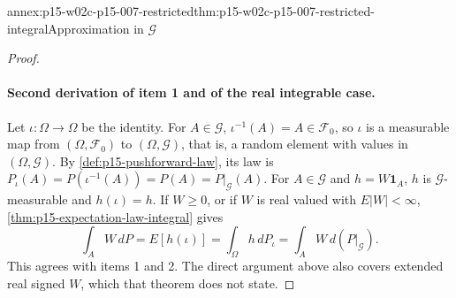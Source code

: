 \begin{annexitem}{annex:p15-w02c-p15-007-restricted}{thm:p15-w02c-p15-007-restricted-integral}{Approximation in \(\mathcal G\)}
\begin{proof}
\paragraph{Second derivation of item 1 and of the real integrable case.}
Let \(\iota:\Omega\to\Omega\) be the identity. For \(A\in\mathcal G\),
\(\iota^{-1}(A)=A\in\mathcal F_0\), so \(\iota\) is a measurable map from
\((\Omega,\mathcal F_0)\) to \((\Omega,\mathcal G)\), that is, a random
element with values in \((\Omega,\mathcal G)\). By
\cref{def:p15-pushforward-law}, its law is
\(P_\iota(A)=P(\iota^{-1}(A))=P(A)=P|_{\mathcal G}(A)\). For \(A\in\mathcal G\)
and \(h=W\mathbf1_A\), \(h\) is \(\mathcal G\)-measurable and
\(h(\iota)=h\). If \(W\geq0\), or if \(W\) is real valued with
\(E|W|<\infty\), \cref{thm:p15-expectation-law-integral} gives
\[
 \int_AW\,dP=E[h(\iota)]=\int_\Omega h\,dP_\iota
            =\int_AW\,d(P|_{\mathcal G}).
\]
This agrees with items 1 and 2. The direct argument above also covers
extended real signed \(W\), which that theorem does not state.
\end{proof}
\end{annexitem}

